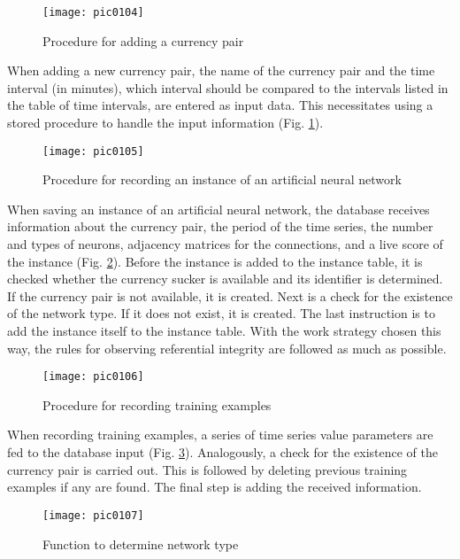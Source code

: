 \begin{figure}[h]
\centering
\texttt{[image: pic0104]}
\caption{Procedure for adding a currency pair}
\label{fig:pic0104}
\end{figure}
\FloatBarrier

When adding a new currency pair, the name of the currency pair and the time interval (in minutes), which interval should be compared to the intervals listed in the table of time intervals, are entered as input data. This necessitates using a stored procedure to handle the input information (Fig. \ref{fig:pic0104}).

\begin{figure}[h]
\centering
\texttt{[image: pic0105]}
\caption{Procedure for recording an instance of an artificial neural network}
\label{fig:pic0105}
\end{figure}
\FloatBarrier

When saving an instance of an artificial neural network, the database receives information about the currency pair, the period of the time series, the number and types of neurons, adjacency matrices for the connections, and a live score of the instance (Fig. \ref{fig:pic0105}). Before the instance is added to the instance table, it is checked whether the currency sucker is available and its identifier is determined. If the currency pair is not available, it is created. Next is a check for the existence of the network type. If it does not exist, it is created. The last instruction is to add the instance itself to the instance table. With the work strategy chosen this way, the rules for observing referential integrity are followed as much as possible.

\begin{figure}[h]
\centering
\texttt{[image: pic0106]}
\caption{Procedure for recording training examples}
\label{fig:pic0106}
\end{figure}
\FloatBarrier

When recording training examples, a series of time series value parameters are fed to the database input (Fig. \ref{fig:pic0106}). Analogously, a check for the existence of the currency pair is carried out. This is followed by deleting previous training examples if any are found. The final step is adding the received information.

\begin{figure}[h]
\centering
\texttt{[image: pic0107]}
\caption{Function to determine network type}
\label{fig:pic0107}
\end{figure}
\FloatBarrier

